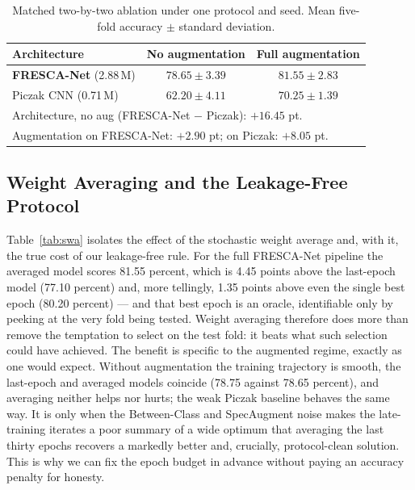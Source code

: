 \documentclass[conference]{IEEEtran}
\begin{document}
\begin{table}[t]
\caption{Matched two-by-two ablation under one protocol and seed. Mean five-fold accuracy $\pm$ standard deviation.}
\label{tab:ablation}
\begin{center}
\renewcommand{\arraystretch}{1.15}
\begin{tabular}{|l|c|c|}
\hline
\textbf{Architecture} & \textbf{No augmentation} & \textbf{Full augmentation} \\
\hline
\textbf{FRESCA-Net} (2.88\,M) & $78.65 \pm 3.39$ & $\mathbf{81.55 \pm 2.83}$ \\
Piczak CNN (0.71\,M) & $62.20 \pm 4.11$ & $70.25 \pm 1.39$ \\
\hline
\multicolumn{3}{l}{\footnotesize Architecture, no aug (FRESCA-Net $-$ Piczak): $+16.45$ pt.} \\
\multicolumn{3}{l}{\footnotesize Augmentation on FRESCA-Net: $+2.90$ pt; on Piczak: $+8.05$ pt.} \\
\end{tabular}
\end{center}
\end{table}

\subsection{Weight Averaging and the Leakage-Free Protocol}
Table~\ref{tab:swa} isolates the effect of the stochastic weight average and, with it, the true cost of our leakage-free rule. For the full FRESCA-Net pipeline the averaged model scores 81.55 percent, which is 4.45 points above the last-epoch model (77.10 percent) and, more tellingly, 1.35 points above even the single best epoch (80.20 percent) --- and that best epoch is an oracle, identifiable only by peeking at the very fold being tested. Weight averaging therefore does more than remove the temptation to select on the test fold: it beats what such selection could have achieved. The benefit is specific to the augmented regime, exactly as one would expect. Without augmentation the training trajectory is smooth, the last-epoch and averaged models coincide (78.75 against 78.65 percent), and averaging neither helps nor hurts; the weak Piczak baseline behaves the same way. It is only when the Between-Class and SpecAugment noise makes the late-training iterates a poor summary of a wide optimum that averaging the last thirty epochs recovers a markedly better and, crucially, protocol-clean solution. This is why we can fix the epoch budget in advance without paying an accuracy penalty for honesty.
\end{document}
